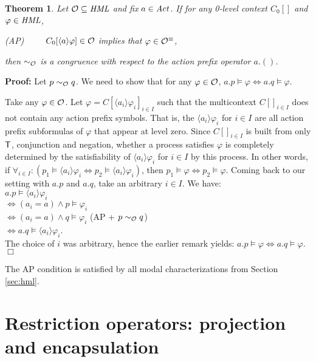\documentclass{eptcs}
\def\hmo{{\cal O}}
\def\hml{{\it HML}}
\def\hmeq{\sim_{\cal O}}
\def\iff{\Leftrightarrow}
\def\true{{\sf T}}
\newtheorem{theo}{Theorem}
\newenvironment{theorem}{\begin{theo} \rm }{\end{theo}}
\newenvironment{proof}{\begin{trivlist} \item[\hspace{\labelsep}\bf Proof:]}{\hfill $\Box$ \end{trivlist}}
\newcommand{\diam}[1]{\langle#1\rangle}
\begin{document}
\begin{theorem} Let $\hmo \subseteq \hml$ and fix $a \in {\it Act}$. If for any 0-level context $C_0[]$ and $\varphi\in \hml$,
\begin{center}
(AP)~~~~~$C_0[\diam{a} \varphi] \in \hmo$ implies that $\varphi \in \hmo^\equiv$,
\end{center}
then $\hmeq$ is a congruence with respect to the action prefix operator $a.()$.
 \end{theorem}
\begin{proof}
Let $p \hmeq q$. We need to show that for any $\varphi \in \hmo$, $a.p \models \varphi \iff a.q \models \varphi$.

Take any $\varphi \in \hmo$. Let $\varphi = C[\diam{a_i} \varphi_i]_{i \in I}$ such that the multicontext $C[]_{i \in I}$ does not contain any action prefix symbols. That is, the $\diam{a_i} \varphi_i$ for $i\in I$ are all action prefix subformulas of $\varphi$ that appear at level zero. Since $C[]_{i\in I}$ is built from only $\true$, conjunction and negation, whether a process satisfies $\varphi$ is completely determined by the satisfiability of $\diam{a_i} \varphi_i$ for $i \in I$ by this process. In other words, if $\forall_{i \in I}: (p_1 \models \diam{a_i} \varphi_i \iff p_2 \models \diam{a_i} \varphi_i)$, then $p_1 \models \varphi \iff p_2\models \varphi$. Coming back to our setting with $a.p$ and $a.q$, take an arbitrary $i \in I$. We have:\\
$a.p \models \diam{a_i} \varphi_i$\\
$\iff (a_i = a) \wedge p \models \varphi_i$\\
$\iff (a_i = a) \wedge q \models \varphi_i$ (AP + $p\hmeq q$)\\
$\iff a.q \models \diam{a_i} \varphi_i$.\\
The choice of $i$ was arbitrary, hence the earlier remark yields: $a.p \models \varphi \iff a.q \models \varphi$.
\end{proof}
The AP condition is satisfied by all modal characterizations from Section \ref{sec:hml}.


\section{Restriction operators: projection and encapsulation}
\end{document}
